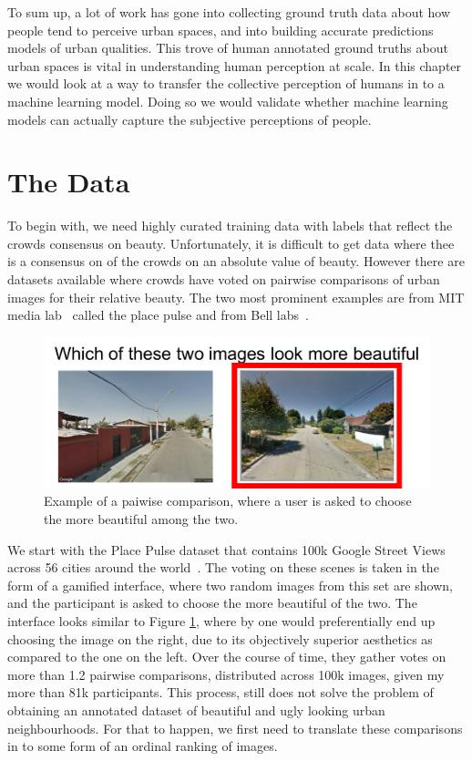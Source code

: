 \vspace{4pt}
To sum up, a lot of work has gone into collecting ground truth data about how people tend to perceive urban spaces, and into building accurate predictions models of urban qualities. This trove of human annotated ground truths about urban spaces is vital in understanding human perception at scale. In this chapter we would look at a way to transfer the collective perception of humans in to a machine learning model. Doing so we would validate whether machine learning models can actually capture the subjective perceptions of people. 

\section{The Data}

\label{Sec:dataset}
To begin with, we need highly curated training data with labels that reflect the crowds consensus on beauty. Unfortunately, it is difficult to get data where thee is a consensus on of the crowds on an absolute value of beauty. However there are datasets available where crowds have voted on pairwise comparisons of urban images for their relative beauty. The two most prominent examples are from MIT media lab~\cite{dubey2016deep} called the place pulse and from Bell labs~\cite{quercia13maps}. 

\begin{figure}
   \centering   \includegraphics[width=\columnwidth]{Pairwise.pdf}
   \caption{Example of a paiwise comparison, where a user is asked to choose the more beautiful among the two.}
   \label{fig:pairwise}
\end{figure}

We start with the  Place Pulse dataset that contains 100k Google Street Views across 56 cities around the world~\cite{dubey2016deep}. The voting on these scenes is taken in the form of a gamified interface, where two random images from this set are shown, and the participant is asked to choose the more beautiful of the two. The interface looks similar to Figure \ref{fig:pairwise}, where by one would preferentially end up choosing the image on the right, due to its objectively superior aesthetics as compared to the one on the left. Over the course of time, they gather votes on more than 1.2 pairwise comparisons, distributed  across 100k images, given my more than 81k participants.
This process, still does not solve the problem of obtaining an annotated dataset of beautiful and ugly looking urban neighbourhoods. For that to happen, we first need to translate these comparisons in to some form of an ordinal ranking of images.

